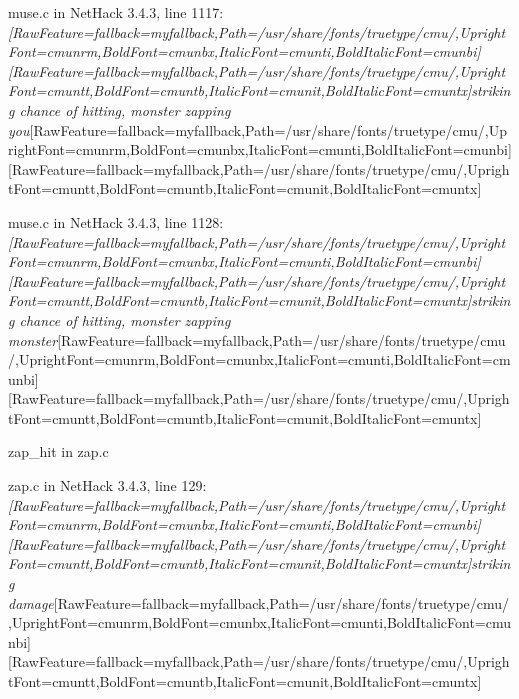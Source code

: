 \begin{myenumerate}
\item{} muse.c in NetHack 3.4.3, line 1117\footnotemark[219]: {\itshape \allowbreak{}\setmainfont{cmunti.ttf}[RawFeature={fallback=myfallback},Path=/usr/share/fonts/truetype/cmu/,UprightFont=cmunrm,BoldFont=cmunbx,ItalicFont=cmunti,BoldItalicFont=cmunbi]\setmonofont{cmunti.ttf}[RawFeature={fallback=myfallback},Path=/usr/share/fonts/truetype/cmu/,UprightFont=cmuntt,BoldFont=cmuntb,ItalicFont=cmunit,BoldItalicFont=cmuntx]\itshape striking chance of hitting, monster zapping you}\allowbreak{}\setmainfont{cmunrm.ttf}[RawFeature={fallback=myfallback},Path=/usr/share/fonts/truetype/cmu/,UprightFont=cmunrm,BoldFont=cmunbx,ItalicFont=cmunti,BoldItalicFont=cmunbi]\setmonofont{cmunrm.ttf}[RawFeature={fallback=myfallback},Path=/usr/share/fonts/truetype/cmu/,UprightFont=cmuntt,BoldFont=cmuntb,ItalicFont=cmunit,BoldItalicFont=cmuntx]
     

\item{} muse.c in NetHack 3.4.3, line 1128\footnotemark[220]: {\itshape \allowbreak{}\setmainfont{cmunti.ttf}[RawFeature={fallback=myfallback},Path=/usr/share/fonts/truetype/cmu/,UprightFont=cmunrm,BoldFont=cmunbx,ItalicFont=cmunti,BoldItalicFont=cmunbi]\setmonofont{cmunti.ttf}[RawFeature={fallback=myfallback},Path=/usr/share/fonts/truetype/cmu/,UprightFont=cmuntt,BoldFont=cmuntb,ItalicFont=cmunit,BoldItalicFont=cmuntx]\itshape striking chance of hitting, monster zapping monster}\allowbreak{}\setmainfont{cmunrm.ttf}[RawFeature={fallback=myfallback},Path=/usr/share/fonts/truetype/cmu/,UprightFont=cmunrm,BoldFont=cmunbx,ItalicFont=cmunti,BoldItalicFont=cmunbi]\setmonofont{cmunrm.ttf}[RawFeature={fallback=myfallback},Path=/usr/share/fonts/truetype/cmu/,UprightFont=cmuntt,BoldFont=cmuntb,ItalicFont=cmunit,BoldItalicFont=cmuntx]
     

\item{} zap\_hit\footnotemark[221] in zap.c\footnotemark[222]

\item{} zap.c in NetHack 3.4.3, line 129\footnotemark[223]: {\itshape \allowbreak{}\setmainfont{cmunti.ttf}[RawFeature={fallback=myfallback},Path=/usr/share/fonts/truetype/cmu/,UprightFont=cmunrm,BoldFont=cmunbx,ItalicFont=cmunti,BoldItalicFont=cmunbi]\setmonofont{cmunti.ttf}[RawFeature={fallback=myfallback},Path=/usr/share/fonts/truetype/cmu/,UprightFont=cmuntt,BoldFont=cmuntb,ItalicFont=cmunit,BoldItalicFont=cmuntx]\itshape striking damage}\allowbreak{}\setmainfont{cmunrm.ttf}[RawFeature={fallback=myfallback},Path=/usr/share/fonts/truetype/cmu/,UprightFont=cmunrm,BoldFont=cmunbx,ItalicFont=cmunti,BoldItalicFont=cmunbi]\setmonofont{cmunrm.ttf}[RawFeature={fallback=myfallback},Path=/usr/share/fonts/truetype/cmu/,UprightFont=cmuntt,BoldFont=cmuntb,ItalicFont=cmunit,BoldItalicFont=cmuntx]
     


\end{myenumerate}
